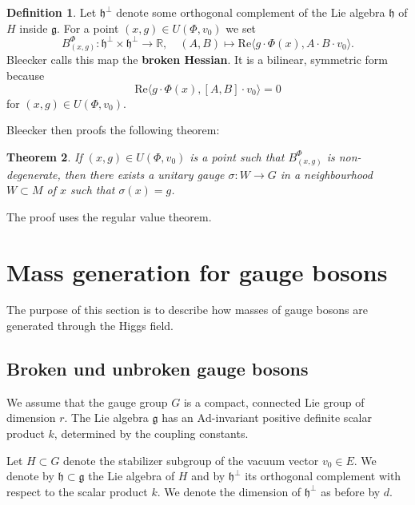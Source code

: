 \documentclass[11pt]{amsart}
\newtheorem{thm}{Theorem}[section]
\theoremstyle{definition}
\newtheorem{defn}[thm]{Definition}
\theoremstyle{remark}
\numberwithin{equation}{section}
\begin{document}
\begin{defn}Let $\mathfrak{h}^\perp$ denote some orthogonal complement of the Lie algebra $\mathfrak{h}$ of $H$ inside $\mathfrak{g}$. For a point $(x,g)\in U(\Phi,v_0)$ we set 
\begin{equation*}
B^\Phi_{(x,g)}\colon\mathfrak{h}^\perp\times\mathfrak{h}^\perp\longrightarrow\mathbb{R},\quad (A,B)\longmapsto \mathrm{Re}\langle g\cdot\Phi(x),A\cdot B\cdot v_0\rangle.
\end{equation*} 
Bleecker calls this map the {\bf broken Hessian}. It is a bilinear, symmetric form because 
\begin{equation*}
\mathrm{Re}\langle g\cdot\Phi(x),[A,B]\cdot v_0\rangle=0
\end{equation*}
for $(x,g)\in U(\Phi,v_0)$.
\end{defn}
Bleecker then proofs the following theorem:
\begin{thm}If $(x,g)\in U(\Phi,v_0)$ is a point such that $B^\Phi_{(x,g)}$ is non-degenerate, then there exists a unitary gauge $\sigma\colon W\rightarrow G$ in a neighbourhood $W\subset M$ of $x$ such that $\sigma(x)=g$.
\end{thm}
The proof uses the regular value theorem.





\section{Mass generation for gauge bosons}\label{sect mass gen}

The purpose of this section is to describe how masses of gauge bosons are generated through the Higgs field. 

\subsection{Broken und unbroken gauge bosons}
We assume that the gauge group $G$ is a compact, connected Lie group of dimension $r$. The Lie algebra $\mathfrak{g}$ has an $\mathrm{Ad}$-invariant positive definite scalar product $k$, determined by the coupling constants.

Let $H\subset G$ denote the stabilizer subgroup of the vacuum vector $v_0\in E$. We denote by $\mathfrak{h}\subset\mathfrak{g}$ the Lie algebra of $H$ and by $\mathfrak{h}^\perp$ its orthogonal complement with respect to the scalar product $k$. We denote the dimension of $\mathfrak{h}^\perp$ as before by $d$.
\end{document}
